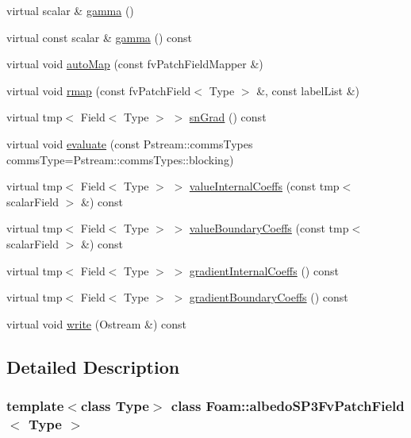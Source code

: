 \begin{DoxyCompactItemize}
\item 
virtual scalar \& \hyperlink{classFoam_1_1albedoSP3FvPatchField_a71bf9bd8eb5d1761ba2da1413a45471d}{gamma} ()
\item 
virtual const scalar \& \hyperlink{classFoam_1_1albedoSP3FvPatchField_a733aed5380906bc053ed1f4105cec3ce}{gamma} () const
\item 
virtual void \hyperlink{classFoam_1_1albedoSP3FvPatchField_a0ab0c43ce90d756c88dd81e3d0a9eef5}{auto\+Map} (const fv\+Patch\+Field\+Mapper \&)
\item 
virtual void \hyperlink{classFoam_1_1albedoSP3FvPatchField_abe233fd0f00c5f2012c2a8f57f20f5cb}{rmap} (const fv\+Patch\+Field$<$ Type $>$ \&, const label\+List \&)
\item 
virtual tmp$<$ Field$<$ Type $>$ $>$ \hyperlink{classFoam_1_1albedoSP3FvPatchField_a7e562a40ead1e8fc57abd192e1d66b79}{sn\+Grad} () const
\item 
virtual void \hyperlink{classFoam_1_1albedoSP3FvPatchField_a1a4ebfb8aa4dc581e54081a12bfbd0d3}{evaluate} (const Pstream\+::comms\+Types comms\+Type=Pstream\+::comms\+Types\+::blocking)
\item 
virtual tmp$<$ Field$<$ Type $>$ $>$ \hyperlink{classFoam_1_1albedoSP3FvPatchField_a2b42863403587b404576ca43b676433e}{value\+Internal\+Coeffs} (const tmp$<$ scalar\+Field $>$ \&) const
\item 
virtual tmp$<$ Field$<$ Type $>$ $>$ \hyperlink{classFoam_1_1albedoSP3FvPatchField_a91b17c5b11d5369441c2de805b957c68}{value\+Boundary\+Coeffs} (const tmp$<$ scalar\+Field $>$ \&) const
\item 
virtual tmp$<$ Field$<$ Type $>$ $>$ \hyperlink{classFoam_1_1albedoSP3FvPatchField_acfc2155b5e8a256253770a1f0b2a840b}{gradient\+Internal\+Coeffs} () const
\item 
virtual tmp$<$ Field$<$ Type $>$ $>$ \hyperlink{classFoam_1_1albedoSP3FvPatchField_aa96c9200cdd52d1806c6de044661f0f0}{gradient\+Boundary\+Coeffs} () const
\item 
virtual void \hyperlink{classFoam_1_1albedoSP3FvPatchField_a293fdfec8bdfbd5c3913ab4c9f3454ff}{write} (Ostream \&) const
\end{DoxyCompactItemize}


\subsection{Detailed Description}
\subsubsection*{template$<$class Type$>$\newline
class Foam\+::albedo\+S\+P3\+Fv\+Patch\+Field$<$ Type $>$}

